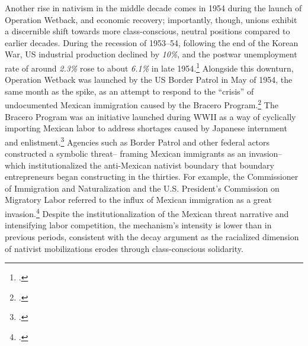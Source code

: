 \documentclass[12pt,a4paper]{article}
\begin{document}
Another rise in nativism in the middle decade comes in 1954 during the launch of Operation Wetback, and economic recovery; importantly, though, unions exhibit a discernible shift towards more class-conscious, neutral positions compared to earlier decades. During the recession of 1953--54, following the end of the Korean War, US industrial production declined by \textit{10\%}, and the postwar unemployment rate of around \textit{2.3\%} rose to about \textit{6.1\%} in late 1954.\footcite{lovasy_prices_1956} Alongside this downturn, Operation Wetback was launched by the US Border Patrol in May of 1954, the same month as the spike, as an attempt to respond to the ``crisis'' of undocumented Mexican immigration caused by the Bracero Program.\footcite{hernandez_crimes_2006} The Bracero Program was an initiative launched during WWII as a way of cyclically importing Mexican labor to address shortages caused by Japanese internment and enlistment.\footcite{hernandez_crimes_2006} Agencies such as Border Patrol and other federal actors constructed a symbolic threat– framing Mexican immigrants as an invasion– which institutionalized the anti-Mexican nativist boundary that boundary entrepreneurs began constructing in the thirties.  For example, the Commissioner of Immigration and Naturalization and the U.S. President's Commission on Migratory Labor referred to the influx of Mexican immigration as a great invasion.\footcite{brinkman_working_2009} Despite the institutionalization of the Mexican threat narrative and intensifying labor competition, the mechanism’s intensity is lower than in previous periods, consistent with the decay argument as the racialized dimension of nativist mobilizations erodes through class-conscious solidarity. 
\end{document}
